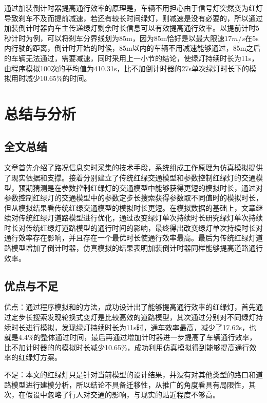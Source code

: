 \documentclass[a4paper,12pt]{article}
\numberwithin{equation}{section}
\begin{document}
通过加装倒计时器提高通行效率的原理是，车辆不用担心由于信号灯突然变为红灯导致刹车不及而提前减速，若还有较长时间绿灯，则减速是没有必要的，所以通过加装倒计时器向车主传递绿灯剩余时长信息可以有效提高通行效率。以提前计时5秒计时为例，可以将刹车分界线划为85m，因为85m恰好是以最大限速$17m/s$在5s内行驶的距离，倒计时开始的时候，85m以内的车辆不用减速能够通过，85m之后的车辆无法通过，需要减速，同时采用上一小节的结论，使绿灯持续时长为11s，
由程序模拟100次的平均值为410.31s，比不加倒计时器的27s单次绿灯时长下的模拟用时减少10.65\%的时间。

	\section{总结与分析}
	\subsection{全文总结}
	文章首先介绍了路况信息实时采集的技术手段，系统组成工作原理为仿真模拟提供了现实依据和支撑。接着分别建立了传统红绿交通模型和参数控制红绿灯的交通模型，预期猜测是在参数控制红绿灯的交通模型中能够获得更短的模拟时长，通过对参数控制红绿灯的交通模型中的参数定步长搜索获得参数取不同值时的模拟时长，但从模拟结果看传统红绿交通模型的模拟时长更短。在模拟数据的基础上，文章继续对传统红绿灯道路模型进行优化，通过改变绿灯单次持续时长研究绿灯单次持续时长对传统红绿灯道路模型的通行时间的影响，最终得出改变绿灯单次持续时长对通行效率存在影响，并且存在一个最优时长使通行效率最高。最后为传统红绿灯道路模型增加了倒计时器，仿真模拟的结果表明加装倒计时器同样能够提高道路通行效率。
	\subsection{优点与不足}
	优点：通过程序模拟和的方法，成功设计出了能够提高通行效率的红绿灯，首先通过定步长搜索发现轮换式变灯是比较高效的道路模型，其次通过分别对不同绿灯持续时长进行模拟，发现绿灯持续时长为11s时，通车效率最高，减少了17.62s，也就是4.4\%的整体通过时间，最后再通过增加计时器进一步提高了车辆通行效率，比不加计时器的的模拟时长减少10.65\%，成功利用仿真模拟得到能够提高通行效率的红绿灯方案。\par
	不足：本文的红绿灯只是针对当前模型的设计结果，并没有对其他类型的路口和道路模型进行建模分析，所以结论不具备迁移性，从推广的角度看具有局限性，其次，在假设中忽略了行人对交通的影响，与现实的贴近程度不够高。
	
\end{document}
